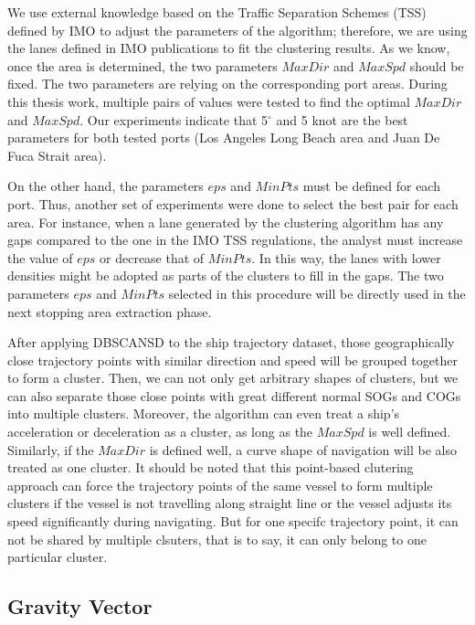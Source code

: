 \documentclass[12pt,glossary]{dalcsthesis}
\begin{document}
We use external knowledge based on the Traffic Separation Schemes (TSS) \cite{tss} defined by IMO to adjust the parameters of the algorithm; therefore, we are using the lanes defined in IMO publications to fit the clustering results. As we know, once the area is determined, the two parameters $MaxDir$ and $MaxSpd$ should be fixed. The two parameters are relying on the corresponding port areas. During this thesis work, multiple pairs of values were tested to find the optimal $MaxDir$ and $MaxSpd$. Our experiments indicate that 5$^{\circ}$ and 5 knot are the best parameters for both tested ports (Los Angeles Long Beach area and Juan De Fuca Strait area). 

On the other hand, the parameters $eps$ and $MinPts$ must be defined for each port. Thus, another set of experiments were done to select the best pair for each area. For instance, when a lane generated by the clustering algorithm has any gaps compared to the one in the IMO TSS regulations, the analyst must increase the value of $eps$ or decrease that of $MinPts$. In this way, the lanes with lower densities might be adopted as parts of the clusters to fill in the gaps. The two parameters $eps$ and $MinPts$ selected in this procedure will be directly used in the next stopping area extraction phase.

After applying DBSCANSD to the ship trajectory dataset, those geographically close trajectory points with similar direction and speed will be grouped together to form a cluster. Then, we can not only get arbitrary shapes of clusters, but we can also separate those close points with great different normal SOGs and COGs into multiple clusters. Moreover, the algorithm can even treat a ship's acceleration or deceleration as a cluster, as long as the $MaxSpd$ is well defined. Similarly, if the $MaxDir$ is defined well, a curve shape of navigation will be also treated as one cluster. It should be noted that this point-based clutering approach can force the trajectory points of the same vessel to form multiple clusters if the vessel is not travelling along straight line or the vessel adjusts its speed significantly during navigating. But for one specifc trajectory point, it can not be shared by multiple clsuters, that is to say, it can only belong to one particular cluster.

\subsection{Gravity Vector}
\label{subsec:gv}
\end{document}
